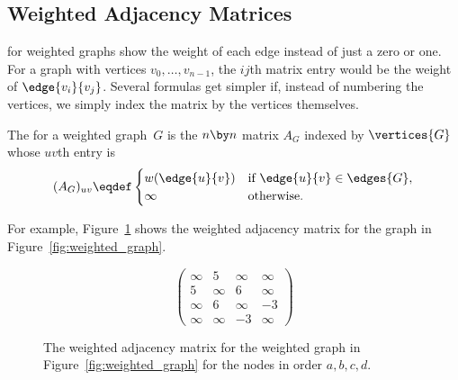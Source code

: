 \subsection{Weighted Adjacency Matrices}

\iffalse
  \textcolor{red}{replaced by ARM with the next paragraph}: There are many
  ways to represent a graph.  We have already seen two ways: you can draw
  it, as in Figure~\ref{fig:weighted_graph} for example, or you can
  represent it with sets of vertices and edges.  Another common
  representation is with an adjacency matrix.
\fi

 for weighted graphs show the weight of each
edge instead of just a zero or one.  For a graph with vertices
$v_0,\dots,v_{n-1}$, the $ij$th matrix entry would be the weight of
$\edge{v_i}{v_j}$.  Several formulas get simpler if, instead of
numbering the vertices, we simply index the matrix by the vertices
themselves.

\begin{definition}\label{def:weighted_adjacency_matrix}
The  for a weighted graph~$G$
is the $n \by n$ matrix $A_G$ indexed by $\vertices{G}$ whose $uv$th entry is
\[
  (A_G)_{uv} \eqdef \begin{cases}
                w(\edge{u}{v}) & \text{if $\edge{u}{v} \in \edges{G}$}, \\
                \infty         & \text{otherwise.}
              \end{cases}
\]
\end{definition}

For example, Figure~\ref{fig:adjacency_matrix} shows the weighted
adjacency matrix for the graph in Figure~\ref{fig:weighted_graph}.

\begin{figure}\redrawntrue
\[
 \begin{pmatrix}
\infty & 5 & \infty & \infty \\
5 & \infty & 6 & \infty \\
\infty & 6 & \infty & -3 \\
\infty & \infty & -3 & \infty
       \end{pmatrix}
\]

\caption{The weighted adjacency matrix for the weighted graph in
  Figure~\ref{fig:weighted_graph} for the nodes in order $a,b,c,d$.}
\label{fig:adjacency_matrix}
\end{figure}

